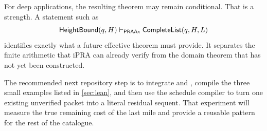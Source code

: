 For deep applications, the resulting theorem may remain conditional.  That is a strength.  A
statement such as
\[
  \mathsf{HeightBound}(q,H)\vdash_{\mathsf{PRAAx}}
  \mathsf{CompleteList}(q,H,L)
\]
identifies exactly what a future effective theorem must provide.  It separates the finite arithmetic
that iPRA can already verify from the domain theorem that has not yet been constructed.

The recommended next repository step is to integrate  and ,
compile the three small examples listed in \cref{sec:lean}, and then use the schedule compiler to turn
one existing unverified packet into a literal residual sequent.  That experiment will measure the
true remaining cost of the last mile and provide a reusable pattern for the rest of the catalogue.
